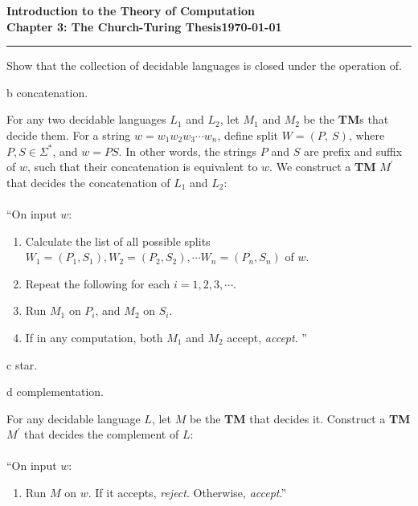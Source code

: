 \documentclass[11pt]{article}
\newcommand{\dated}{\today}
\begin{document}
\textbf{Introduction to the Theory of
Computation}\hfill\textbf{\myname}\\[0.01in]
\textbf{Chapter 3: The Church-Turing Thesis}\hfill\textbf{\dated}\\
\smallskip\hrule\bigskip

\begin{problem}{3.15}
Show that the collection of decidable languages is closed under the operation of.
\end{problem}

\begin{problem}[Part]{b}
concatenation.
\end{problem}

For any two decidable languages $L_1$ and $L_2$, let $M_1$ and $M_2$ be the \textbf{TM}s that decide them. For a string $w = w_1w_2w_3 \cdots w_n$, define split $W = (P, \ S)$, where $P, S \in \Sigma^*$, and $w = PS$. In other words, the strings $P$ and $S$ are prefix and suffix of $w$, such that their concatenation is equivalent to $w$. We construct a \textbf{TM} $M^{'}$ that decides the concatenation of $L_1$ and $L_2$: \\
\\
\textquotedblleft On input $w$:
\begin{enumerate}
\item Calculate the list of all possible splits $W_1 = (P_1, S_1), W_2 = (P_2, S_2), \cdots W_n = (P_n, S_n)$ of $w$.
\item Repeat the following for each $i = 1, 2, 3, \cdots$.
\item \hspace*{0.5cm} Run $M_1$ on $P_i$, and $M_2$ on $S_i$.
\item \hspace*{0.5cm} If in any computation, both $M_1$ and $M_2$ accept, \textit{accept}. \textquotedblright
\end{enumerate}

\begin{problem}[Part]{c}
star.
\end{problem}


\begin{problem}[Part]{d}
complementation.
\end{problem}

For any decidable language $L$, let $M$ be the \textbf{TM} that decides it. Construct a \textbf{TM} $M^{'}$ that decides the complement of $L$: \\
\\
\textquotedblleft On input $w$:
\begin{enumerate}
\item Run $M$ on $w$. If it accepts, \textit{reject}. Otherwise, \textit{accept}.\textquotedblright
\end{enumerate}
\end{document}
